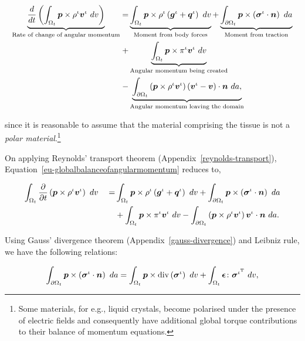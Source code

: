 \begin{equation}
\begin{split}
\underbrace{\frac{d}{dt}\left(\int_{\Omega_{t}}  \mbox{\boldmath$ p$} \times \rho^{\iota}
  \mbox{\boldmath$ v$}^{\iota}\ dv\right)}_{\text{Rate of change of angular  momentum}}  = 
& \underbrace{\int_{\Omega_{t}} \mbox{\boldmath$ p$} \times \rho^{\iota} \left(\mbox{\boldmath$ g$}^{\iota} +
  \mbox{\boldmath$ q$}^{\iota}\right)\ dv}_{\text{Moment from body forces}} 
+ \underbrace{\int_{\partial \Omega_{t}}
  \mbox{\boldmath$ p$} \times \left(\mbox{\boldmath$\sigma$}^{\iota}\cdot\mbox{\boldmath$ n$}\right)\ da}_{\text{Moment from traction}}\\ 
+ & \underbrace{\int_{\Omega_{t}} \mbox{\boldmath$ p$} \times
  \pi^{\iota}\mbox{\boldmath$ v$}^{\iota}\ dv}_{\text{Angular momentum being created}}
\\ 
- & \underbrace{\int_{\partial \Omega_{t}} \left(\mbox{\boldmath$ p$} \times \rho^{\iota}
  \mbox{\boldmath$ v$}^{\iota}\right) \left(\mbox{\boldmath$ v$}^{\iota} -
\mbox{\boldmath$ v$}\right) \cdot \mbox{\boldmath$ n$}\ da,}_{\text{Angular momentum leaving the domain}} 
\end{split}
\label{eu-globalbalanceofangularmomentum}
\end{equation}

\noindent since it is reasonable to assume that the material
comprising the tissue is not a {\em polar material}.\footnote{Some
  materials, for e.g., liquid crystals, become polarised under the
  presence of electric fields and consequently have additional global
  torque contributions to their balance of momentum equations.}

On applying Reynolds' transport theorem
(Appendix~\ref{reynolds-transport}),
Equation~\ref{eu-globalbalanceofangularmomentum} reduces to,

\begin{equation*}
\begin{split}
\int_{\Omega_{t}} \frac{\partial}{\partial t}\left( \mbox{\boldmath$ p$} \times \rho^{\iota}
  \mbox{\boldmath$ v$}^{\iota}\right)\ dv \quad =
& \int_{\Omega_{t}} \mbox{\boldmath$ p$} \times \rho^{\iota} \left(\mbox{\boldmath$ g$}^{\iota} +
  \mbox{\boldmath$ q$}^{\iota}\right)\ dv
+ \int_{\partial \Omega_{t}}
  \mbox{\boldmath$ p$} \times \left(\mbox{\boldmath$\sigma$}^{\iota}\cdot\mbox{\boldmath$ n$}\right)\ da\\
& + \int_{\Omega_{t}} \mbox{\boldmath$ p$} \times 
  \pi^{\iota}\mbox{\boldmath$ v$}^{\iota}\ dv - \int_{\partial \Omega_{t}} \left(\mbox{\boldmath$ p$}
  \times \rho^{\iota} 
  \mbox{\boldmath$ v$}^{\iota}\right) \mbox{\boldmath$ v$}^{\iota} \cdot \mbox{\boldmath$ n$}\ da.
\end{split}
\end{equation*}

Using Gauss' divergence theorem (Appendix~\ref{gauss-divergence}) and
Leibniz rule, we have the following relations:

\begin{displaymath}
\int_{\partial \Omega_{t}}
  \bp \times \left(\Bsigma^{\iota}\cdot\bn\right)\ da =
\int_{\Omega_{t}}
  \bp \times \mathrm{div}\left(\Bsigma^{\iota}\right)\ dv
+\int_{\Omega_{t}} \Bepsilon\colon\Bsigma^{\iota^{\mathrm{T}}} \ dv,
\end{displaymath}

